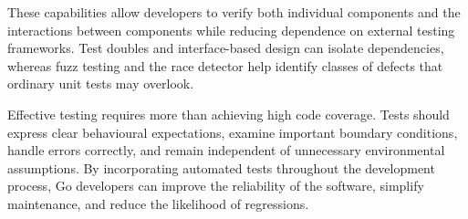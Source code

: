 These capabilities allow developers to verify both individual components and the interactions between components while reducing dependence on external testing frameworks. Test doubles and interface-based design can isolate dependencies, whereas fuzz testing and the race detector help identify classes of defects that ordinary unit tests may overlook.

Effective testing requires more than achieving high code coverage. Tests should express clear behavioural expectations, examine important boundary conditions, handle errors correctly, and remain independent of unnecessary environmental assumptions. By incorporating automated tests throughout the development process, Go developers can improve the reliability of the software, simplify maintenance, and reduce the likelihood of regressions.

